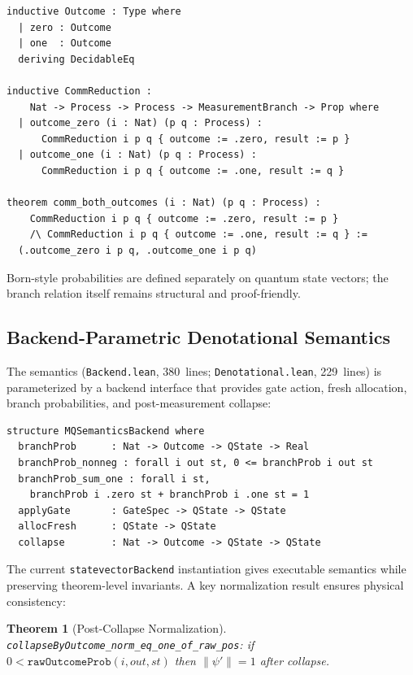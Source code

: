 \documentclass[11pt]{article}
\newtheorem{theorem}{Theorem}[section]
\theoremstyle{definition}
\theoremstyle{remark}
\begin{document}
\begin{lstlisting}[caption={COMM rule with constructive both-branches (from \texttt{CommRule.lean})}]
inductive Outcome : Type where
  | zero : Outcome
  | one  : Outcome
  deriving DecidableEq

inductive CommReduction :
    Nat -> Process -> Process -> MeasurementBranch -> Prop where
  | outcome_zero (i : Nat) (p q : Process) :
      CommReduction i p q { outcome := .zero, result := p }
  | outcome_one (i : Nat) (p q : Process) :
      CommReduction i p q { outcome := .one, result := q }

theorem comm_both_outcomes (i : Nat) (p q : Process) :
    CommReduction i p q { outcome := .zero, result := p }
    /\ CommReduction i p q { outcome := .one, result := q } :=
  (.outcome_zero i p q, .outcome_one i p q)
\end{lstlisting}

\noindent
Born-style probabilities are defined separately on quantum state
vectors; the branch relation itself remains structural and
proof-friendly.

\subsection{Backend-Parametric Denotational Semantics}

The semantics (\texttt{Backend.lean}, 380~lines;
\texttt{Denotational.lean}, 229~lines) is parameterized by a backend
interface that provides gate action, fresh allocation, branch
probabilities, and post-measurement collapse:

\begin{lstlisting}[caption={Backend interface (from \texttt{Backend.lean})}]
structure MQSemanticsBackend where
  branchProb      : Nat -> Outcome -> QState -> Real
  branchProb_nonneg : forall i out st, 0 <= branchProb i out st
  branchProb_sum_one : forall i st,
    branchProb i .zero st + branchProb i .one st = 1
  applyGate       : GateSpec -> QState -> QState
  allocFresh      : QState -> QState
  collapse        : Nat -> Outcome -> QState -> QState
\end{lstlisting}

\noindent
The current \texttt{statevectorBackend} instantiation gives executable
semantics while preserving theorem-level invariants.  A key
normalization result ensures physical consistency:

\begin{theorem}[Post-Collapse Normalization]
\texttt{collapseByOutcome\_norm\_eq\_one\_of\_raw\_pos}:
if $0 < \texttt{rawOutcomeProb}(i, \mathit{out}, \mathit{st})$ then
$\|\psi'\| = 1$ after collapse.
\end{theorem}
\end{document}
